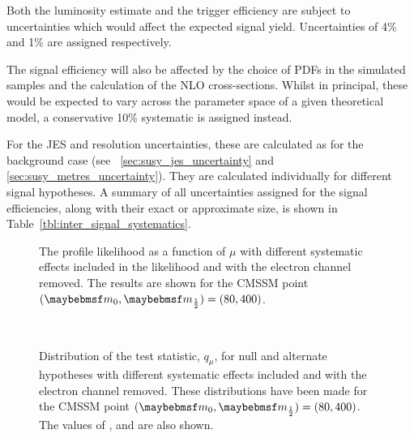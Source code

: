 Both the luminosity estimate and the trigger efficiency are subject to
uncertainties which would affect the expected signal yield. Uncertainties of 4\%
and 1\% are assigned respectively.

The signal efficiency will also be affected by the choice of \acp{PDF} in the
simulated samples and the calculation of the \ac{NLO} cross-sections. Whilst in
principal, these would be expected to vary across the parameter space of a given
theoretical model, a conservative 10\% systematic is assigned instead.

For the \ac{JES} and \MET resolution uncertainties, these are calculated as for
the background case (see \secs~\ref{sec:susy_jes_uncertainty} and
\ref{sec:susy_metres_uncertainty}). They are calculated individually for
different signal hypotheses. A summary of all uncertainties assigned for the
signal efficiencies, along with their exact or approximate size, is shown in
Table~\ref{tbl:inter_signal_systematics}.



\begin{figure}
\centering
{}\quad
{}
\caption[The profile likelihood as a function of $\mu$]{The profile likelihood
  as a function of $\mu$  with different
  systematic effects included in the likelihood and
   with the electron channel removed. The results
  are shown for the \ac{CMSSM} point $(\Mzero, \Mhalf) = (80, 400)$. }
\label{fig:inter_pl}
\end{figure}

\begin{figure}
\centering
{}
\\
\caption[Distributions of the test statistic, $q_{\mu}$]{Distribution of the
  test statistic, $q_{\mu}$, for null and alternate hypotheses with different
  systematic effects included and with the electron channel removed. These
  distributions have been made for the \ac{CMSSM} point $(\Mzero, \Mhalf) = (80,
  400)$. The values of \CLb, \CLspb and \CLs are also shown.}
\label{fig:inter_cls}
\end{figure}

